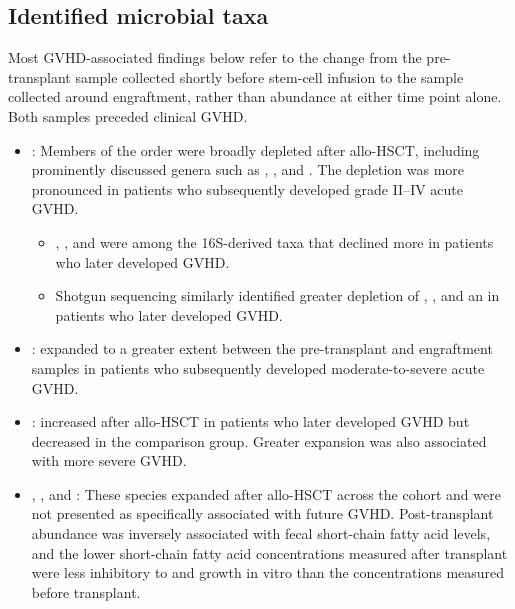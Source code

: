 \documentclass[11pt,a4paper]{article}
\begin{document}
\subsection{Identified microbial taxa}
Most GVHD-associated findings below refer to the change from the pre-transplant sample collected shortly before stem-cell infusion to the sample collected around engraftment, rather than abundance at either time point alone. Both samples preceded clinical GVHD.

\begin{itemize}

\item \taxClostridiales: Members of the \taxClostridiales order were broadly depleted after allo-HSCT, including prominently discussed genera such as \taxBlautia, \taxFaecalibacterium, and \taxOscillibacter. The depletion was more pronounced in patients who subsequently developed grade II--IV acute GVHD.
  \begin{itemize}
  \item \taxRuminococcaceae, \taxClostridiumIV, and \taxFlavonifractor were among the 16S-derived taxa that declined more in patients who later developed GVHD.
  \item Shotgun sequencing similarly identified greater depletion of \taxAnaeromassilibacillusSp, \taxButyricicoccusSp, and an \taxLachnoanaerobaculumSpecies in patients who later developed GVHD.
  \end{itemize}

\item \taxEnterococcusFaecium: \taxEfaecium expanded to a greater extent between the pre-transplant and engraftment samples in patients who subsequently developed moderate-to-severe acute GVHD.

\item \taxParabacteroides: \taxParabacteroides increased after allo-HSCT in patients who later developed GVHD but decreased in the comparison group. Greater expansion was also associated with more severe GVHD.

\item \taxStaphylococcusAureus, \taxStaphylococcusEpidermidis, and \taxStaphylococcusSimulans: These species expanded after allo-HSCT across the cohort and were not presented as specifically associated with future GVHD. Post-transplant \taxStaphylococcus abundance was inversely associated with fecal short-chain fatty acid levels, and the lower short-chain fatty acid concentrations measured after transplant were less inhibitory to \taxSaureus and \taxSepidermidis growth in vitro than the concentrations measured before transplant.


\end{itemize}
\end{document}
